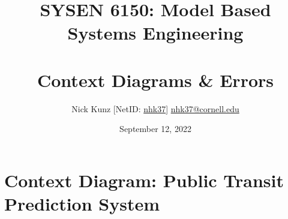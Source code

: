 \documentclass{article}
\begin{document}
\title{SYSEN 6150: Model Based Systems Engineering\\~\\
    \Large Context Diagrams \& Errors
}
\author{
    Nick Kunz [NetID: \url{nhk37}] \hyperlink{nhk37@cornell.edu}{nhk37@cornell.edu}}
\date{September 12, 2022}
\maketitle
\thispagestyle{fancy}

\section*{Context Diagram: Public Transit Prediction System}

\end{document}
